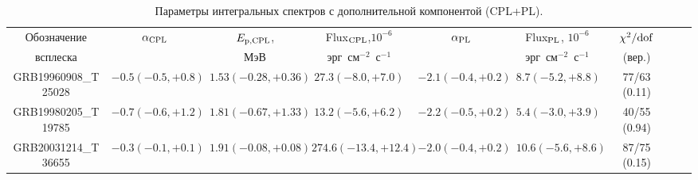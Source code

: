 {\renewcommand\tabcolsep{3pt}
\begin{table} [h]
 \centering
  \caption{Параметры интегральных спектров с дополнительной компонентой (CPL+PL).}
  \label{tab:extra_comp}
  \scriptsize
  \begin{center}
  \begin{tabular}{ccccccccc}
  \hline
  \hline
  Обозначение & $\alpha_{\mathrm{CPL}}$ & $E_{\mathrm{p,CPL}}$, & Flux$_{\mathrm{CPL}}$,$10^{-6}$ & $\alpha_{\mathrm{PL}}$ & 
      Flux$_{\mathrm{PL}}$, $10^{-6}$ & $\chi^2/{\mathrm{dof}}$ \\
  всплеска &   & МэВ & эрг~см$^{-2}$~с$^{-1}$ &  & эрг~см$^{-2}$~с$^{-1}$ & (вер.) \\
  \hline  
GRB19960908\_T25028 & $-0.5(-0.5,+0.8)$ & $1.53(-0.28,+0.36)$ & $27.3(-8.0,+7.0)$   & $-2.1(-0.4,+0.2)$ & $8.7(-5.2,+8.8)$  & 77/63 (0.11) \\
GRB19980205\_T19785 & $-0.7(-0.6,+1.2)$ & $1.81(-0.67,+1.33)$ & $13.2(-5.6,+6.2)$   & $-2.2(-0.5,+0.2)$ & $5.4(-3.0,+3.9)$  & 40/55 (0.94) \\
GRB20031214\_T36655 & $-0.3(-0.1,+0.1)$ & $1.91(-0.08,+0.08)$ & $274.6(-13.4,+12.4)$& $-2.0(-0.4,+0.2)$ & $10.6(-5.6,+8.6)$ & 87/75 (0.15) \\
\hline
\end{tabular}
\end{center}
\end{table}
}